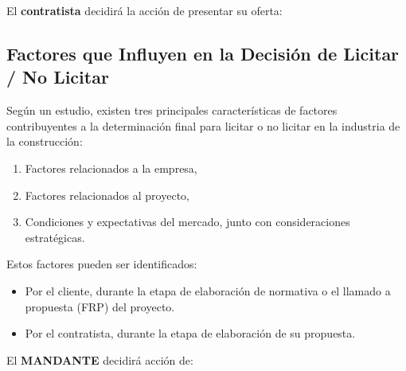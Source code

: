 \noindent El \textbf{contratista} decidirá la acción de presentar su oferta:

\begin{center}
\end{center}

\subsection*{Factores que Influyen en la Decisión de Licitar / No Licitar}

\noindent Según un estudio, existen tres principales características de factores contribuyentes a la determinación final para licitar o no licitar en la industria de la construcción:

\begin{enumerate}
    \item Factores relacionados a la empresa,
    \item Factores relacionados al proyecto,
    \item Condiciones y expectativas del mercado, junto con consideraciones estratégicas.
\end{enumerate}

\noindent Estos factores pueden ser identificados:
\begin{itemize}
    \item Por el cliente, durante la etapa de elaboración de normativa o el llamado a propuesta (FRP) del proyecto.
    \item Por el contratista, durante la etapa de elaboración de su propuesta.
\end{itemize}

\noindent El \textbf{MANDANTE} decidirá acción de:
\begin{center}
\end{center}
